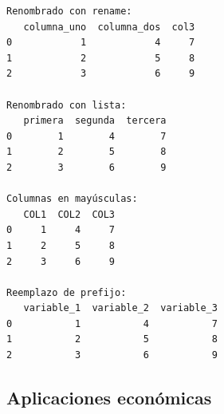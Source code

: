 \documentclass[
  doc,
  floatsintext,
  longtable,
  a4paper,
  nolmodern,
  notxfonts,
  notimes,
  12pt,
  colorlinks=true,linkcolor=blue,citecolor=blue,urlcolor=blue]{apa7}
\begin{document}
\begin{verbatim}
Renombrado con rename:
   columna_uno  columna_dos  col3
0            1            4     7
1            2            5     8
2            3            6     9

Renombrado con lista:
   primera  segunda  tercera
0        1        4        7
1        2        5        8
2        3        6        9

Columnas en mayúsculas:
   COL1  COL2  COL3
0     1     4     7
1     2     5     8
2     3     6     9

Reemplazo de prefijo:
   variable_1  variable_2  variable_3
0           1           4           7
1           2           5           8
2           3           6           9
\end{verbatim}

\subsection{Aplicaciones económicas}\label{aplicaciones-econuxf3micas}
\end{document}
